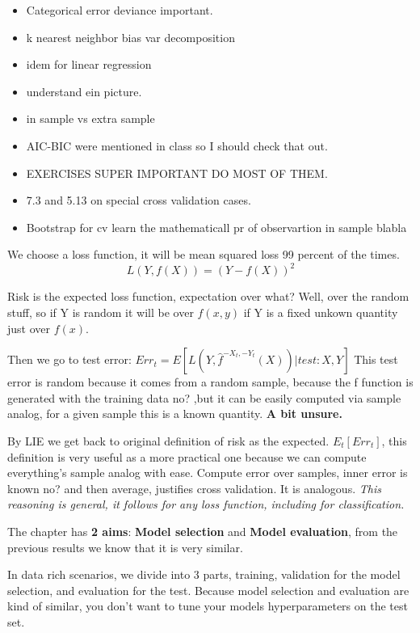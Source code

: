 \documentclass{article}
\begin{document}
\begin{itemize}
    \item Categorical error deviance important.
    \item k nearest neighbor bias var decomposition 
    \item idem for linear regression
    \item understand ein picture.
    \item in sample vs extra sample 
    \item AIC-BIC were mentioned in class so I should check that out. 
    \item EXERCISES SUPER IMPORTANT DO MOST OF THEM.
    \item 7.3 and 5.13 on special cross validation cases.
    \item Bootstrap for cv learn the mathematicall pr of observartion in sample blabla
\end{itemize}

We choose a loss function, it will be mean squared loss 99 percent of the times. $$L(Y,f(X))=(Y-f(X))^2$$ 

Risk is the expected loss function, expectation over what? Well, over the random stuff, so if Y is random it will be over $f(x,y)$ if Y is a fixed unkown quantity just over $f(x)$.

Then we go to test error: $Err_t= E[L(Y,\hat{f}^{-X_t,-Y_t}(X))|test: X,Y]$
This test error is random because it comes from a random sample, because the f function is generated with the training data no? ,but it can be easily computed via sample analog, for a given sample this is a known quantity. \textbf{A bit unsure.}

By LIE we get back to original definition of risk as the expected. $E_t[Err_t]$, this definition is very useful as a more practical one because we can compute everything's sample analog with ease. Compute error over samples, inner error is known no? and then average, justifies cross validation. It is analogous.
\textit{This reasoning is general, it follows for any loss function, including for classification.}

The chapter has \textbf{2 aims}: \textbf{Model selection} and \textbf{Model evaluation}, from the previous results we know that it is very similar.

In data rich scenarios, we divide into 3 parts, training, validation for the model selection, and evaluation for the test. Because model selection and evaluation are kind of similar, you don't want to tune your models hyperparameters on the test set.
\end{document}
